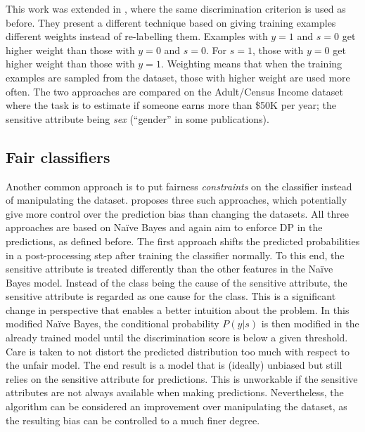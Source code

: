This work was extended in \citet{calders2009building},
where the same discrimination criterion is used as before.
They present a different technique based on giving training examples different weights
instead of re-labelling them.
Examples with \(y=1\) and \(s=0\) get higher weight than those with \(y=0\) and \(s=0\).
For \(s=1\), those with \(y=0\) get higher weight than those with \(y=1\).
Weighting means that when the training examples are sampled from the dataset,
those with higher weight are used more often.
The two approaches are compared on the Adult/Census Income dataset \citep{kohavi1996scaling}
where the task is to estimate if someone earns more than \$50K per year;
the sensitive attribute being \emph{sex} (``gender'' in some publications).

\subsection{Fair classifiers}\label{fair-classifiers}
Another common approach is to put fairness \emph{constraints} on the classifier
instead of manipulating the dataset.
\citet{calders2010three} proposes three such approaches,
which potentially give more control over the prediction bias than changing the datasets.
All three approaches are based on Na\"ive Bayes
and again aim to enforce \ac{DP} in the predictions, as defined before.
The first approach shifts the predicted probabilities in a post-processing step
after training the classifier normally.
To this end, the sensitive attribute is treated differently
than the other features in the Na\"ive Bayes model.
Instead of the class being the cause of the sensitive attribute,
the sensitive attribute is regarded as one cause for the class.
This is a significant change in perspective that enables a better intuition about the problem.
In this modified Na\"ive Bayes,
the conditional probability \(P(y|s)\) is then modified in the already trained model
until the discrimination score is below a given threshold.
Care is taken to not distort the predicted distribution too much with respect to the unfair model.
The end result is a model that is (ideally) unbiased
but still relies on the sensitive attribute for predictions.
This is unworkable if the sensitive attributes are not always available when making predictions.
Nevertheless, the algorithm can be considered an improvement over manipulating the dataset,
as the resulting bias can be controlled to a much finer degree.

